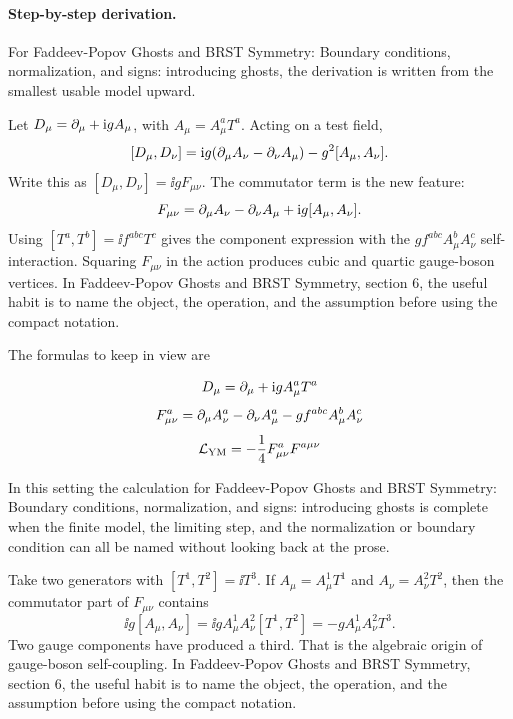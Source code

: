 \paragraph{Step-by-step derivation.}

For Faddeev-Popov Ghosts and BRST Symmetry: Boundary conditions, normalization, and signs: introducing ghosts, the derivation is written from the smallest usable model upward.

Let \(D_\mu=\partial_\mu+\mathrm i gA_\mu\), with \(A_\mu=A_\mu^aT^a\).  Acting on a test field,
\[
  [D_\mu,D_\nu]
  =
  \mathrm i g(\partial_\mu A_\nu-\partial_\nu A_\mu)-g^2[A_\mu,A_\nu].
\]
Write this as \([D_\mu,D_\nu]=\ii gF_{\mu\nu}\).  The commutator term is the new feature:
\[
  F_{\mu\nu}=\partial_\mu A_\nu-\partial_\nu A_\mu+\mathrm i g[A_\mu,A_\nu].
\]
Using \([T^a,T^b]=\ii f^{abc}T^c\) gives the component expression with the \(gf^{abc}A_\mu^bA_\nu^c\) self-interaction.  Squaring \(F_{\mu\nu}\) in the action produces cubic and quartic gauge-boson vertices.  In Faddeev-Popov Ghosts and BRST Symmetry, section 6, the useful habit is to name the object, the operation, and the assumption before using the compact notation.

The formulas to keep in view are

\[
  D_\mu=\partial_\mu+\mathrm i gA_\mu^aT^a
\]
\[
  F_{\mu\nu}^a=\partial_\mu A_\nu^a-\partial_\nu A_\mu^a-gf^{abc}A_\mu^bA_\nu^c
\]
\[
  \mathcal L_{\mathrm{YM}}=-\frac14F_{\mu\nu}^aF^{a\mu\nu}
\]

In this setting the calculation for Faddeev-Popov Ghosts and BRST Symmetry: Boundary conditions, normalization, and signs: introducing ghosts is complete when the finite model, the limiting step, and the normalization or boundary condition can all be named without looking back at the prose.




\begin{example}
Take two generators with \([T^1,T^2]=\ii T^3\).  If \(A_\mu=A_\mu^1T^1\) and \(A_\nu=A_\nu^2T^2\), then the commutator part of \(F_{\mu\nu}\) contains
\[
  \ii g[A_\mu,A_\nu]=\ii gA_\mu^1A_\nu^2[T^1,T^2]=-gA_\mu^1A_\nu^2T^3.
\]
Two gauge components have produced a third.  That is the algebraic origin of gauge-boson self-coupling.  In Faddeev-Popov Ghosts and BRST Symmetry, section 6, the useful habit is to name the object, the operation, and the assumption before using the compact notation.
\end{example}



